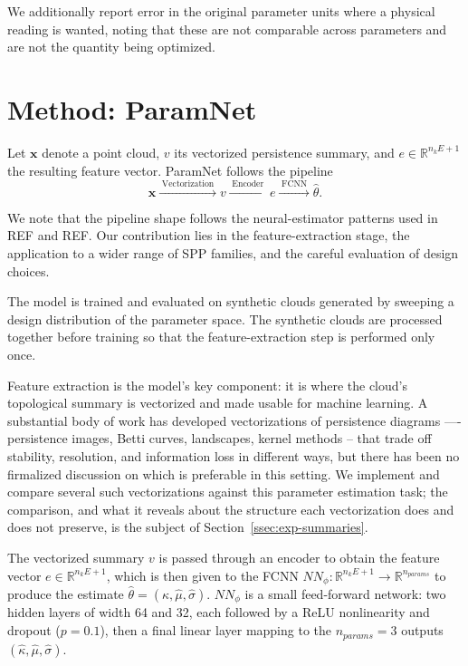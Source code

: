 \documentclass[11pt,letterpaper]{article}
\newcommand{\R}{\mathbb{R}}
\newcommand{\1}{\mathds{1}}
\newcommand{\pc}{\mathbf{x}}
\theoremstyle{plain}
\theoremstyle{definitioncolon}
\begin{document}
We additionally report error in the original parameter units where a physical
reading is wanted, noting that these are not comparable across parameters and
are not the quantity being optimized.


\section{Method: ParamNet}
\label{sec:method}

Let $\pc$ denote a point cloud, $v$ its vectorized persistence summary, and
$e \in \R^{n_k E + 1}$ the resulting feature vector. ParamNet follows the pipeline
    \begin{equation}
    \label{eq:pipeline}
    \pc \xrightarrow{\;\text{Vectorization}\;} v
    \xrightarrow{\;\text{Encoder}\;} e
    \xrightarrow{\;\text{FCNN}\;} \hat\theta.
    \end{equation}

We note that the pipeline shape follows the neural-estimator patterns used in REF
and REF. Our contribution lies in the feature-extraction stage, the application to
a wider range of SPP families, and the careful evaluation of design choices.

The model is trained and evaluated on synthetic clouds generated by sweeping a
design distribution of the parameter space. The synthetic clouds are processed
together before training so that the feature-extraction step is performed only
once.

Feature extraction is the model's key component: it is where the cloud's 
topological summary is vectorized and made usable for machine learning. 
A substantial body of work has developed vectorizations of persistence 
diagrams —- persistence images, Betti curves, landscapes, kernel methods -- 
that trade off stability, resolution, and information loss in different ways, 
but there has been no firmalized discussion on which is preferable in this setting. 
We implement and compare several such vectorizations against this parameter
estimation task; the comparison, and what it reveals about the 
structure each vectorization does and does not preserve, is the subject of 
Section~\ref{ssec:exp-summaries}.

The vectorized summary $v$ is passed through an encoder to obtain the
feature vector $e \in \R^{n_k E + 1}$, which is then given to the FCNN
$NN_\phi: \R^{n_k E + 1} \to \R^{n_{params}}$ to produce the estimate
$\hat\theta = (\hat\kappa, \hat\mu, \hat\sigma)$. $NN_\phi$ is a small feed-forward network: two hidden layers of width 64 and 
32, each followed by a ReLU nonlinearity and dropout ($p=0.1$), then a final 
linear layer mapping to the $n_{params}=3$ outputs $(\hat\kappa, \hat\mu, \hat\sigma)$.
\end{document}
